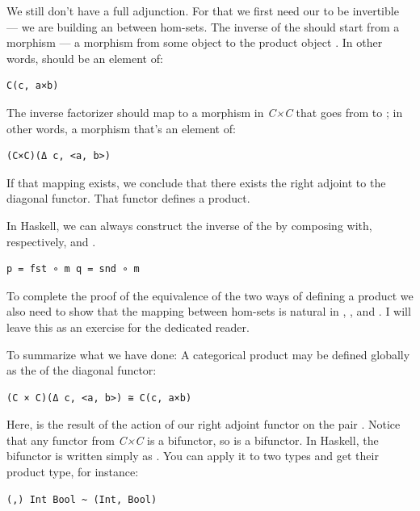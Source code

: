 We still don't have a full adjunction. For that we first need our
 to be invertible --- we are building an
 between hom-sets. The inverse of the
 should start from a morphism  --- a
morphism from some object  to the product object .
In other words,  should be an element of:

\begin{verbatim}
C(c, a×b)
\end{verbatim}

The inverse factorizer should map  to a morphism
 in \emph{C×C} that goes from
 to
; in other words, a morphism
that's an element of:

\begin{verbatim}
(C×C)(Δ c, <a, b>)
\end{verbatim}

If that mapping exists, we conclude that there exists the right adjoint
to the diagonal functor. That functor defines a product.

In Haskell, we can always construct the inverse of the
 by composing  with, respectively,
 and .

\begin{verbatim}
p = fst ∘ m q = snd ∘ m
\end{verbatim}

To complete the proof of the equivalence of the two ways of defining a
product we also need to show that the mapping between hom-sets is
natural in , , and . I will leave this as
an exercise for the dedicated reader.

To summarize what we have done: A categorical product may be defined
globally as the  of the diagonal functor:

\begin{verbatim}
(C × C)(Δ c, <a, b>) ≅ C(c, a×b)
\end{verbatim}

Here,  is the result of the action of our right adjoint
functor  on the pair
. Notice that any functor from
\emph{C×C} is a bifunctor, so  is a bifunctor. In
Haskell, the  bifunctor is written simply as
\code{(,)}. You can apply it to two types and get their product type,
for instance:

\begin{verbatim}
(,) Int Bool ~ (Int, Bool)
\end{verbatim}

